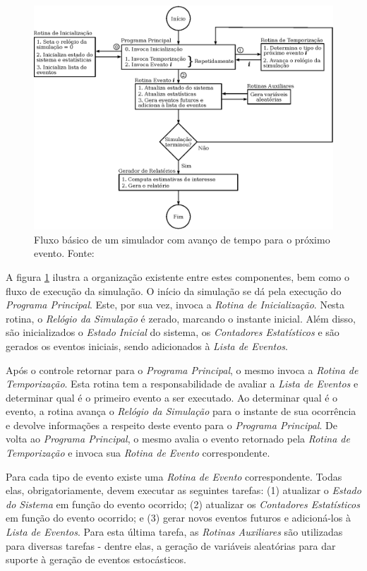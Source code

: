 \begin{figure}[htb!]
\centering\includegraphics{img/simulation_flow.eps}
\caption{\label{fig:simflow}Fluxo básico de um simulador com avanço de tempo para o próximo evento. Fonte:~\cite{Law}}
\end{figure}

A figura \ref{fig:simflow} ilustra a organização existente entre estes
componentes, bem como o fluxo de execução da simulação. O início da simulação se
dá pela execução do \textit{Programa Principal}. Este, por sua vez, invoca a
\textit{Rotina de Inicialização}. Nesta rotina, o \textit{Relógio da Simulação}
é zerado, marcando o instante inicial. Além disso, são inicializados o
\textit{Estado Inicial} do sistema, os \textit{Contadores Estatísticos} e são
gerados os eventos iniciais, sendo adicionados à \textit{Lista de Eventos}.

Após o controle retornar para o \textit{Programa Principal}, o mesmo invoca a
\textit{Rotina de Temporização}. Esta rotina tem a responsabilidade de avaliar a
\textit{Lista de Eventos} e determinar qual é o primeiro evento a ser executado.
Ao determinar qual é o evento, a rotina avança o \textit{Relógio da Simulação}
para o instante de sua ocorrência e devolve informações a respeito deste evento
para o \textit{Programa Principal}. De volta ao \textit{Programa Principal}, o
mesmo avalia o evento retornado pela \textit{Rotina de Temporização} e invoca
sua \textit{Rotina de Evento} correspondente.

Para cada tipo de evento existe uma \textit{Rotina de Evento} correspondente.
Todas elas, obrigatoriamente, devem executar as seguintes tarefas: (1) atualizar
o \textit{Estado do Sistema} em função do evento ocorrido; (2) atualizar os
\textit{Contadores Estatísticos} em função do evento ocorrido; e (3) gerar
novos eventos futuros e adicioná-los à \textit{Lista de Eventos}. Para esta
última tarefa, as \textit{Rotinas Auxiliares} são utilizadas para diversas
tarefas - dentre elas, a geração de variáveis aleatórias para dar suporte à
geração de eventos estocásticos.

